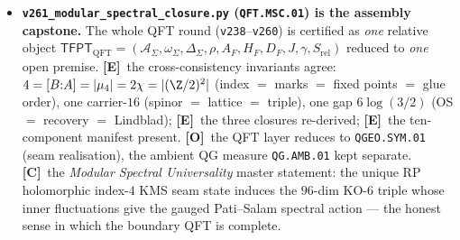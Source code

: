 \documentclass[11pt]{article}
\providecommand{\mE}{\textbf{[E]}}\providecommand{\mC}{\textbf{[C]}}
\providecommand{\mO}{\textbf{[O]}}\providecommand{\mX}{\textbf{[X]}}
\providecommand{\vref}[1]{\texttt{#1}}
\begin{document}
\begin{itemize}
  $E_8$ Cartan is even/$\det1$/positive-definite; \mE\ $H^2(\mathrm{K3},\Z)=U^3\oplus E_8({-}1)^2$ (rank $22$,
  $\det{-}1$, even, signature $(3,19)$); \mE\ the seam is $T^2/(z{\mapsto}{-}z)$ with $4$ marks (orbifold
  Euler char $0$); \mE\ the carrier-$16$ are the $|A[2]|{=}2^4{=}16$ Kummer nodes $=\dim S^+$ (\vref{v197}),
  $16{=}4{\times}4$; \mE\ honest note --- the rank-$16$ Kummer lattice is \emph{not} the $E_8({-}1)^2$
  summand. \mC\ so the \vref{v1} ``glue $D_5{\oplus}A_3{+}\mu_4{\Rightarrow}E_8$'' is the lattice shadow of a
  single object; $E_8$ appears both locally (du Val $\mathbb C^2/2I$, \vref{v232}/\vref{v236}) and globally
  ($H^2$ summand). A unification, not a closure.
\item \textbf{\texttt{v261\_modular\_spectral\_closure.py} (\texttt{QFT.MSC.01}) is the assembly capstone.}
  The whole QFT round (\vref{v238}--\vref{v260}) is certified as \emph{one} relative object
  $\mathsf{TFPT}_{\mathrm{QFT}}=(\mathcal A_\Sigma,\omega_\Sigma,\Delta_\Sigma,\rho,A_F,H_F,D_F,J,\gamma,
  S_{\mathrm{rel}})$ reduced to \emph{one} open premise. \mE\ the cross-consistency invariants agree:
  $4=[B{:}A]=|\mu_4|=2\chi=|(\Z/2)^2|$ (index $=$ marks $=$ fixed points $=$ glue order), one carrier-$16$
  (spinor $=$ lattice $=$ triple), one gap $6\log(3/2)$ (OS $=$ recovery $=$ Lindblad); \mE\ the three
  closures re-derived; \mE\ the ten-component manifest present. \mO\ the QFT layer reduces to
  \texttt{QGEO.SYM.01} (seam realisation), the ambient QG measure \texttt{QG.AMB.01} kept separate. \mC\
  the \emph{Modular Spectral Universality} master statement: the unique RP holomorphic index-$4$ KMS seam
  state induces the $96$-dim KO-$6$ triple whose inner fluctuations give the gauged Pati--Salam spectral
  action --- the honest sense in which the boundary QFT is complete.
\end{itemize}
\end{document}
